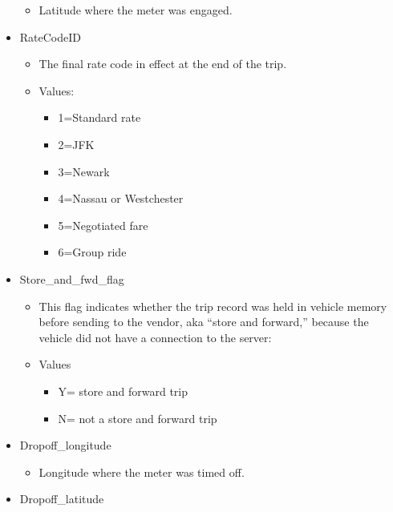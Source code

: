\documentclass[
  18pt,
  a4paper]{article}
\providecommand{\tightlist}{%
  \setlength{\itemsep}{0pt}\setlength{\parskip}{0pt}}
\begin{document}
\begin{itemize}
  \begin{itemize}
  \tightlist
  \item
    Latitude where the meter was engaged.\\
  \end{itemize}
\item
  RateCodeID

  \begin{itemize}
  \tightlist
  \item
    The final rate code in effect at the end of the trip.
  \item
    Values:

    \begin{itemize}
    \tightlist
    \item
      1=Standard rate\\
    \item
      2=JFK
    \item
      3=Newark
    \item
      4=Nassau or Westchester
    \item
      5=Negotiated fare
    \item
      6=Group ride\\
    \end{itemize}
  \end{itemize}
\item
  Store\_and\_fwd\_flag

  \begin{itemize}
  \tightlist
  \item
    This flag indicates whether the trip record was held in vehicle
    memory before sending to the vendor, aka ``store and forward,''
    because the vehicle did not have a connection to the server:
  \item
    Values

    \begin{itemize}
    \tightlist
    \item
      Y= store and forward trip\\
    \item
      N= not a store and forward trip\\
    \end{itemize}
  \end{itemize}
\item
  Dropoff\_longitude

  \begin{itemize}
  \tightlist
  \item
    Longitude where the meter was timed off.\\
  \end{itemize}
\item
  Dropoff\_latitude


\end{itemize}
\end{document}
